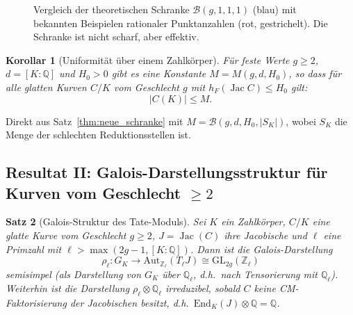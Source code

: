 ﻿\documentclass[12pt,a4paper]{article}
\theoremstyle{plain}
\newtheorem{theorem}{Satz}[section]
\newtheorem{corollary}[theorem]{Korollar}
\theoremstyle{definition}
\theoremstyle{remark}
\newenvironment{proof*}[1][Beweis]{%
  \begin{proof}[#1]\renewcommand{\qedsymbol}{$\blacksquare$}}
  {\end{proof}}
\newcommand{\Q}{\mathbb{Q}}
\newcommand{\Z}{\mathbb{Z}}
\newcommand{\End}{\mathrm{End}}
\DeclareMathOperator{\Jac}{Jac}
\begin{document}
\begin{figure}[H]
\centering
{}
\caption{Vergleich der theoretischen Schranke $\mathcal B(g,1,1,1)$ (blau) mit
  bekannten Beispielen rationaler Punktanzahlen (rot, gestrichelt).
  Die Schranke ist nicht scharf, aber effektiv.}
\label{fig:schranke}
\end{figure}

\begin{corollary}[Uniformität über einem Zahlkörper]\label{cor:uniform}
Für feste Werte $g \geq 2$, $d = [K:\Q]$ und $H_0 > 0$ gibt es eine Konstante
$M = M(g,d,H_0)$, so dass für alle glatten Kurven $C/K$ vom Geschlecht $g$
mit $h_F(\Jac C) \leq H_0$ gilt:
\[
  |C(K)| \leq M.
\]
\end{corollary}

\begin{proof*}
Direkt aus Satz~\ref{thm:neue_schranke} mit $M = \mathcal{B}(g,d,H_0,|S_K|)$,
wobei $S_K$ die Menge der schlechten Reduktionsstellen ist.
\end{proof*}

\subsection{Resultat II: Galois-Darstellungsstruktur für Kurven vom Geschlecht $\geq 2$}

\begin{theorem}[Galois-Struktur des Tate-Moduls]\label{thm:galois_struktur}
Sei $K$ ein Zahlkörper, $C/K$ eine glatte Kurve vom Geschlecht $g \geq 2$,
$J = \Jac(C)$ ihre Jacobische und $\ell$ eine Primzahl mit
$\ell > \max(2g-1, [K:\Q])$. Dann ist die Galois-Darstellung
\[
  \rho_\ell: G_K \longrightarrow \mathrm{Aut}_{\Z_\ell}(T_\ell J) \cong \mathrm{GL}_{2g}(\Z_\ell)
\]
\emph{semisimpel} (als Darstellung von $G_K$ über $\Q_\ell$, d.h.\ nach Tensorierung mit $\Q_\ell$).
Weiterhin ist die Darstellung $\rho_\ell \otimes \Q_\ell$ irreduzibel, sobald $C$ keine
\emph{CM-Faktorisierung} der Jacobischen besitzt, d.h.\ $\End_K(J) \otimes \Q = \Q$.
\end{theorem}
\end{document}
